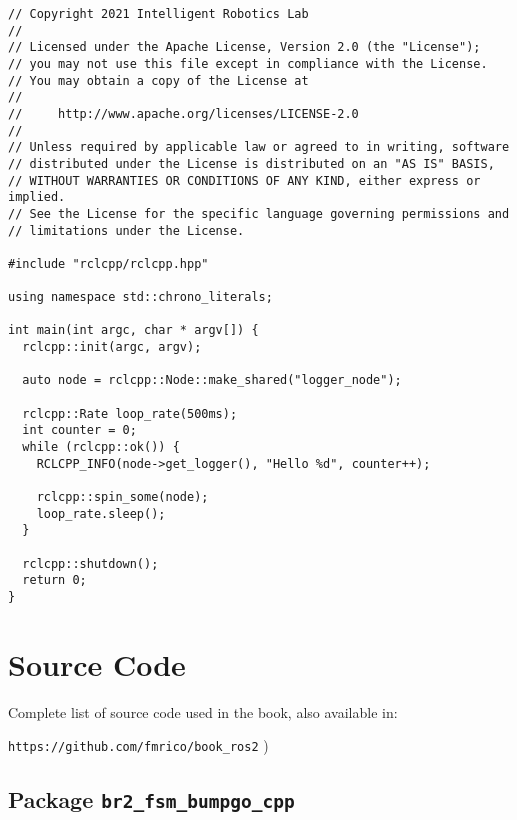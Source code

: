  \footnotesize
\begin{tcolorbox}[sharp corners, colframe=gray!80, colback=LightGray, left=0pt, top=0pt, bottom=0pt, title=\texttt{br2\_basics/src/logger.cpp}]
  \begin{verbatim}
// Copyright 2021 Intelligent Robotics Lab
//
// Licensed under the Apache License, Version 2.0 (the "License");
// you may not use this file except in compliance with the License.
// You may obtain a copy of the License at
//
//     http://www.apache.org/licenses/LICENSE-2.0
//
// Unless required by applicable law or agreed to in writing, software
// distributed under the License is distributed on an "AS IS" BASIS,
// WITHOUT WARRANTIES OR CONDITIONS OF ANY KIND, either express or implied.
// See the License for the specific language governing permissions and
// limitations under the License.

#include "rclcpp/rclcpp.hpp"

using namespace std::chrono_literals;

int main(int argc, char * argv[]) {
  rclcpp::init(argc, argv);

  auto node = rclcpp::Node::make_shared("logger_node");

  rclcpp::Rate loop_rate(500ms);
  int counter = 0;
  while (rclcpp::ok()) {
    RCLCPP_INFO(node->get_logger(), "Hello %d", counter++);

    rclcpp::spin_some(node);
    loop_rate.sleep();
  }

  rclcpp::shutdown();
  return 0;
}     \end{verbatim}
    \end{tcolorbox}
  \normalsize



\appendix

\chapter[Source Code]{Source Code}
\label{cap:source}
Complete list of source code used in the book, also available in:

\vspace{0.5cm}
\large
\texttt{https://github.com/fmrico/book\_ros2}
\normalsize
)
\section{Package \texttt{br2\_fsm\_bumpgo\_cpp}}
\label{sec:anex:br2_fsm_bumpgo_cpp}

